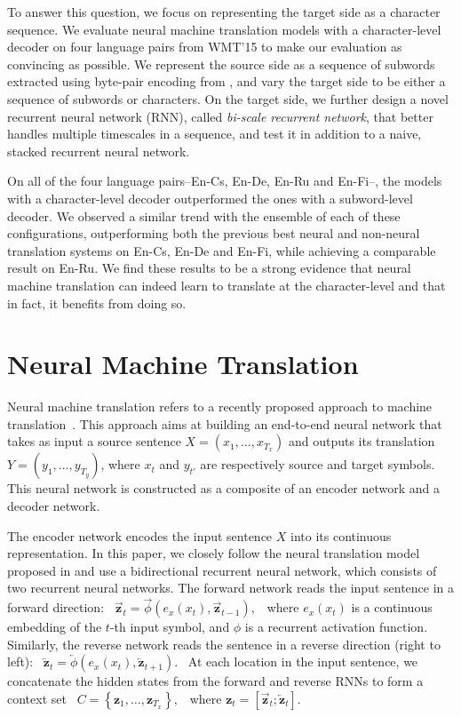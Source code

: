\documentclass[11pt]{article}
\newcommand{\vect}[1]{\mathbf{#1}}
\newcommand{\vz}[0]{\vect{z}}
\newcommand{\ola}{\overleftarrow}
\newcommand{\ora}{\overrightarrow}
\begin{document}
To answer this question, we focus on representing the target side as a character
sequence.  We evaluate neural machine translation models with a character-level
decoder on four language pairs from WMT'15 to make our evaluation as convincing
as possible. We represent the source side as a sequence of subwords extracted
using byte-pair encoding from , and vary the target
side to be either a sequence of subwords or characters. On the target side, we
further design a novel recurrent neural network (RNN), called {\em bi-scale recurrent
network}, that better handles multiple timescales in a sequence, and test it in
addition to a naive, stacked recurrent neural network.

On all of the four language pairs--En-Cs, En-De, En-Ru and En-Fi--, the models with a
character-level decoder outperformed the ones with a subword-level decoder.  We
observed a similar trend with the ensemble of each of these configurations,
outperforming both the previous best neural and non-neural translation systems
on En-Cs, En-De and En-Fi, while achieving a comparable result on En-Ru.  We
find these results to be a strong evidence that neural machine translation can
indeed learn to translate at the character-level and that in fact, it benefits
from doing so.

\section{Neural Machine Translation}
\label{sec:nmt}

Neural machine translation refers to a recently proposed approach to machine
translation~\cite{forcada1997recursive,kalchbrenner2013recurrent,Cho-et-al-EMNLP2014,sutskever2014sequence}. 
This approach aims at building an end-to-end neural network that takes as input a source sentence
$X=(x_1,\dots,x_{T_x})$ and outputs its translation $Y=(y_1,\dots,y_{T_y})$,
where $x_t$ and $y_{t'}$ are respectively source and target symbols.  This
neural network is constructed as a composite of an encoder network and a decoder
network.

The encoder network encodes the input sentence $X$ into its continuous
representation. In this paper, we closely follow the neural translation model
proposed in  and use a bidirectional recurrent
neural network, which consists of two recurrent neural
networks. The forward network reads the input sentence in a forward
direction:
\mbox{
$
    \ora{\vz}_t = \ora{\phi}(e_x(x_t), \ora{\vz}_{t-1}),
$
}
where $e_x(x_t)$ is a continuous embedding of the $t$-th input symbol, and $\phi$
is a recurrent activation function. Similarly, the reverse network reads the
sentence in a reverse direction (right to left):
\mbox{
    $
    \ola{\vz}_t = \ola{\phi}(e_x(x_t), \ola{\vz}_{t+1}).
    $
}
At each location in the input sentence, we concatenate the hidden states from
the forward and reverse RNNs to form a context set
\mbox{
$
    C = \left\{ \vz_1, \ldots, \vz_{T_x} \right\},
$
}
where $\vz_t = \left[ \ora{\vz}_t; \ola{\vz}_t \right]$.
\end{document}
